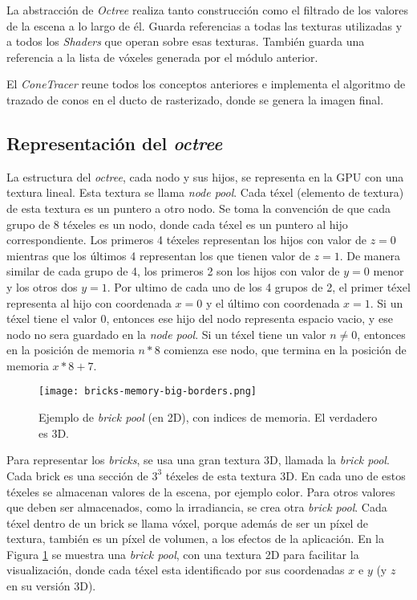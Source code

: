 La abstracción de \textit{Octree} realiza tanto construcción como el filtrado de los valores de la escena a lo largo de él.
Guarda referencias a todas las texturas utilizadas y a todos los \textit{Shaders} que operan sobre esas texturas.
También guarda una referencia a la lista de vóxeles generada por el módulo anterior.

El \textit{ConeTracer} reune todos los conceptos anteriores e implementa el algoritmo de trazado de conos en el ducto de rasterizado, donde se genera la imagen final.

\subsection{Representación del \textit{octree}}

La estructura del \textit{octree}, cada nodo y sus hijos, se representa en la GPU con una textura lineal.
Esta textura se llama \textit{node pool}.
Cada téxel (elemento de textura) de esta textura es un puntero a otro nodo.
Se toma la convención de que cada grupo de 8 téxeles es un nodo, donde cada téxel es un puntero al hijo correspondiente.
Los primeros 4 téxeles representan los hijos con valor de $z = 0$ mientras que los últimos 4 representan los que tienen valor de $z = 1$.
De manera similar de cada grupo de 4, los primeros 2 son los hijos con valor de $y = 0$ menor y los otros dos $y = 1$.
Por ultimo de cada uno de los 4 grupos de 2, el primer téxel representa al hijo con coordenada $x = 0$ y el último con coordenada $x = 1$.
Si un téxel tiene el valor $0$, entonces ese hijo del nodo representa espacio vacio, y ese nodo no sera guardado en la \textit{node pool}.
Si un téxel tiene un valor $n \not = 0$, entonces en la posición de memoria $n * 8$ comienza ese nodo, que termina en la posición de memoria $x * 8 + 7$.

\begin{figure}[h!]
    \centering
    \texttt{[image: bricks-memory-big-borders.png]}
    \caption{Ejemplo de \textit{brick pool} (en 2D), con indices de memoria. El verdadero es 3D.}
    \label{fig:brick_pool_example}
\end{figure}

Para representar los \textit{bricks}, se usa una gran textura 3D, llamada la \textit{brick pool}.
Cada brick es una sección de $3^3$ téxeles de esta textura 3D.
En cada uno de estos téxeles se almacenan valores de la escena, por ejemplo color.
Para otros valores que deben ser almacenados, como la irradiancia, se crea otra \textit{brick pool}.
Cada téxel dentro de un brick se llama vóxel, porque además de ser un píxel de textura, también es un píxel de volumen, a los efectos de la aplicación.
En la Figura \ref{fig:brick_pool_example} se muestra una \textit{brick pool}, con una textura 2D para facilitar la visualización, donde cada téxel esta identificado por sus coordenadas $x$ e $y$ (y $z$ en su versión 3D).

